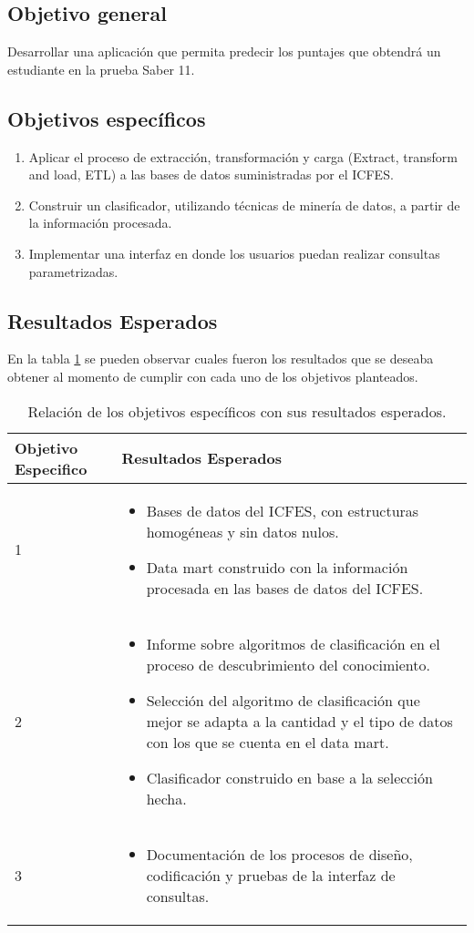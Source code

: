 \subsection{Objetivo general}
Desarrollar una aplicación que permita predecir los puntajes que obtendrá un estudiante en la prueba Saber 11\degree.
\subsection{Objetivos específicos}
\begin{enumerate}
\item Aplicar el proceso de extracción, transformación y carga (Extract, transform and load, ETL) a las bases de datos suministradas por el ICFES.
\item Construir un clasificador, utilizando técnicas de minería de datos, a partir de la información procesada.
\item Implementar una interfaz en donde los usuarios puedan realizar consultas parametrizadas.
\end{enumerate}
\subsection{Resultados Esperados}
En la tabla \ref{tab:cuadro1} se pueden observar cuales fueron los resultados que se deseaba obtener al momento de cumplir con cada uno de los objetivos planteados.
\begin{table}[!htb]
\centering
\begin{tabular}{|p{2.5cm}|m{13cm}|}
\hline
	\rowcolor[gray]{0.9} 
	\textbf{Objetivo Especifico} &
	\textbf{Resultados Esperados} \\ 
\hline 
1 & \begin{itemize} \item Bases de datos del ICFES, con estructuras homogéneas y sin datos nulos.
					\item Data mart construido con la información procesada en las bases de datos del ICFES.
	\end{itemize} \\
\hline
2 & \begin{itemize} \item Informe sobre algoritmos de clasificación en el proceso de descubrimiento del conocimiento.
					\item Selección del algoritmo de clasificación que mejor se adapta a la cantidad y el tipo de datos con los que se cuenta en el data mart.
					\item Clasificador construido en base a la selección hecha.
	\end{itemize} \\
\hline
3 & \begin{itemize} \item Documentación de los procesos de diseño, codificación y pruebas de la interfaz de consultas.
	\end{itemize} \\ 
\hline
\end{tabular}
\caption{Relación de los objetivos específicos con sus resultados esperados.}
\label{tab:cuadro1}
\end{table}

